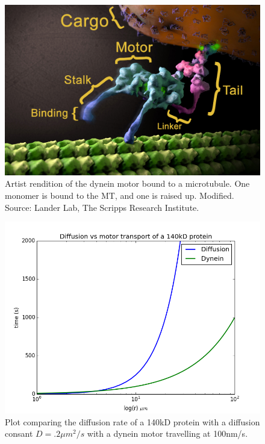 \documentclass[10pt]{article} %
\begin{document}
\begin{figure}[h!]
  \centering
  \includegraphics[width=.45\textwidth,keepaspectratio]{../figures/dynein-artist-rendition.jpg}
  \caption{Artist rendition of the dynein motor bound to a microtubule. One monomer is bound to the MT, and one is raised up. Modified. Source: Lander Lab, The Scripps Research Institute.}
  \label{dynein-artist-rendition}
\end{figure}

\begin{figure}[h!]
  \centering
  \includegraphics[width=.45\textwidth,keepaspectratio]{../figures/diffusion_vs_dynein.png}
  \caption{Plot comparing the diffusion rate of a 140kD protein with a diffusion consant $D = .2 \mu m^2/s$ with a dynein motor travelling at 100nm/s.}
  \label{diffusion_vs_dynein}
\end{figure}


\end{document}
